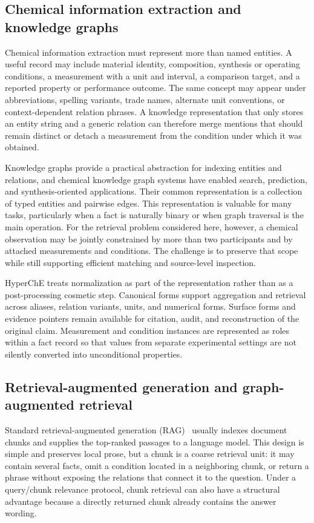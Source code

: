 \subsection{Chemical information extraction and knowledge graphs}

Chemical information extraction must represent more than named entities. A useful record may include material identity, composition, synthesis or operating conditions, a measurement with a unit and interval, a comparison target, and a reported property or performance outcome. The same concept may appear under abbreviations, spelling variants, trade names, alternate unit conventions, or context-dependent relation phrases. A knowledge representation that only stores an entity string and a generic relation can therefore merge mentions that should remain distinct or detach a measurement from the condition under which it was obtained.

Knowledge graphs provide a practical abstraction for indexing entities and relations, and chemical knowledge graph systems have enabled search, prediction, and synthesis-oriented applications. Their common representation is a collection of typed entities and pairwise edges. This representation is valuable for many tasks, particularly when a fact is naturally binary or when graph traversal is the main operation. For the retrieval problem considered here, however, a chemical observation may be jointly constrained by more than two participants and by attached measurements and conditions. The challenge is to preserve that scope while still supporting efficient matching and source-level inspection.

HyperChE treats normalization as part of the representation rather than as a post-processing cosmetic step. Canonical forms support aggregation and retrieval across aliases, relation variants, units, and numerical forms. Surface forms and evidence pointers remain available for citation, audit, and reconstruction of the original claim. Measurement and condition instances are represented as roles within a fact record so that values from separate experimental settings are not silently converted into unconditional properties.

\subsection{Retrieval-augmented generation and graph-augmented retrieval}

Standard retrieval-augmented generation (RAG)~\citep{RAG,RAGsurvey} usually indexes document chunks and supplies the top-ranked passages to a language model. This design is simple and preserves local prose, but a chunk is a coarse retrieval unit: it may contain several facts, omit a condition located in a neighboring chunk, or return a phrase without exposing the relations that connect it to the question. Under a query/chunk relevance protocol, chunk retrieval can also have a structural advantage because a directly returned chunk already contains the answer wording.

